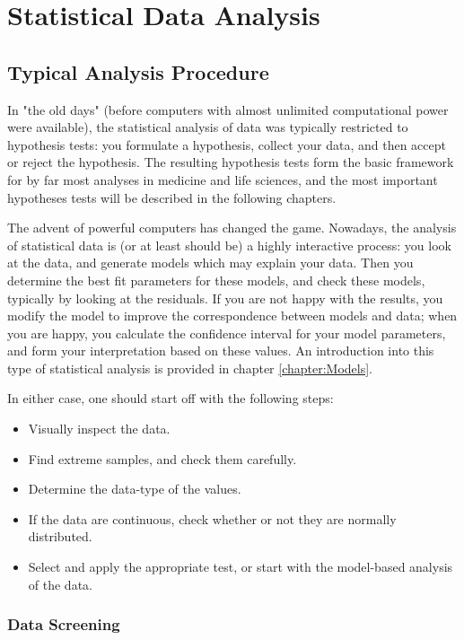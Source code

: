 \chapter{Statistical Data Analysis}

\section{Typical Analysis Procedure}

In "the old days" (before computers with almost unlimited computational power were available), the statistical analysis of data was typically restricted to hypothesis tests: you formulate a hypothesis, collect your data, and then accept or reject the hypothesis. The resulting hypothesis tests form the basic framework for by far most analyses in  medicine and life sciences, and the most important hypotheses tests will be described in the following chapters.

The advent of powerful computers has changed the game. Nowadays, the analysis of statistical data is (or at least should be) a highly interactive process: you look at the data, and generate models which may explain your data. Then you determine the best fit parameters for these models, and check these models, typically by looking at the residuals. If you are not happy with the results, you modify the model to improve the correspondence between models and data; when you are happy, you calculate the confidence interval for your model parameters, and form your interpretation based on these values. An introduction into this type of statistical analysis is provided in chapter \ref{chapter:Models}.

In either case, one should start off with the following steps:
\begin{itemize}
  \item Visually inspect the data.
  \item Find extreme samples, and check them carefully.
  \item Determine the data-type of the values.
  \item If the data are continuous, check whether or not they are normally distributed.
  \item Select and apply the appropriate test, or start with the model-based analysis of the data.
\end{itemize}

\subsection{Data Screening}

